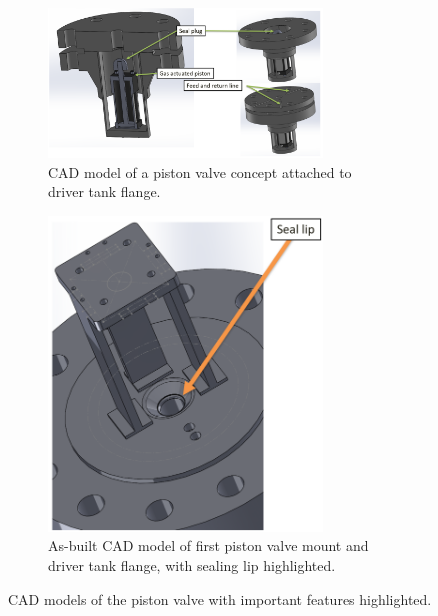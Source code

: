\begin{figure}[b!]
    \vspace{16pt}
    \centering
    \begin{subfigure}[t]{0.6\textwidth}
        \centering
        \includegraphics[width=0.8\textwidth]{design/photos/PistonValve_Gen1_CAD_labels.PNG}
        \caption{CAD model of a piston valve concept attached to driver tank flange.}
        \label{fig:cad concept}
    \end{subfigure}
    \hfill
    \begin{subfigure}[t]{0.35\textwidth}
        \centering
        \includegraphics[width=0.8\textwidth]{design/photos/PistonMount_CAD_lip.PNG}
        \caption{As-built CAD model of first piston valve mount and driver tank flange, with sealing lip highlighted.}
        \label{fig:cad lip}
    \end{subfigure}
    \caption{CAD models of the piston valve with important features highlighted.}
    \label{fig:cad gen 1}
    \vspace{16pt}
\end{figure}

